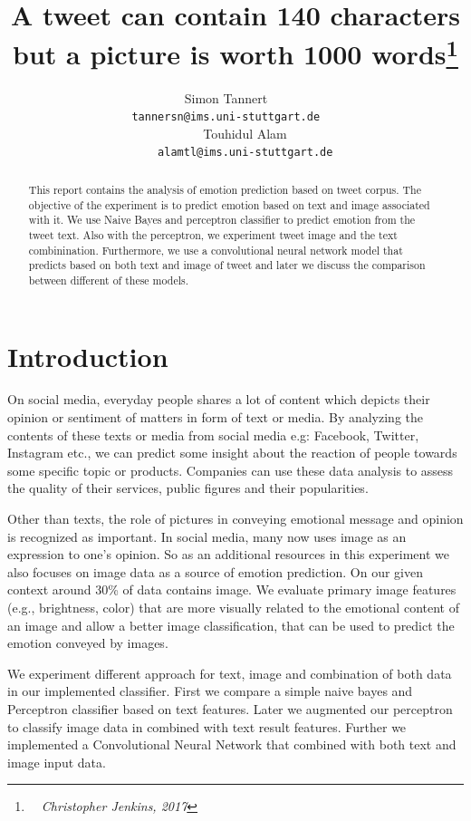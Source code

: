 \documentclass[11pt]{article}
\title{A tweet can contain 140 characters but a picture is worth 1000
  words\thanks{~~\emph{Christopher Jenkins, 2017}}}
\author{Simon Tannert~~~ \\
  {\tt tannersn@ims.uni-stuttgart.de~~~} \\\And
  ~~~Touhidul Alam \\
  {\tt ~~~alamtl@ims.uni-stuttgart.de} \\}
\date{}
\begin{document}
\maketitle
\begin{abstract}
  This report contains the analysis of emotion prediction based on tweet corpus. The objective of the experiment is to predict emotion based on text and image associated with it. We use Naive Bayes and perceptron classifier to predict emotion from the tweet text. Also with the perceptron, we experiment tweet image and the text combinination. Furthermore, we use a convolutional neural network model that predicts based on both text and image of tweet and later we discuss the comparison between different of these models.
\end{abstract}

\section{Introduction}

On social media, everyday people shares a lot of content which depicts their opinion or sentiment of matters in form of text or media. By analyzing the contents of these texts or media from social media e.g: Facebook, Twitter, Instagram etc., we can predict some insight about the reaction of people towards some specific topic or products. Companies can use these data analysis to assess the quality of their services, public figures and their popularities.

Other than texts, the role of pictures in conveying emotional message and opinion is recognized as important. In social media, many now uses image as an expression to one's opinion. So as an additional resources in this experiment we also focuses on image data as a source of emotion prediction. On our given context around 30\% of data contains image. We evaluate primary image features (e.g., brightness, color) that are more visually related to the emotional content of an image and allow a better image classification, that can be used to predict the emotion conveyed by images. 

We experiment different approach for text, image and combination of both data in our implemented classifier. First we compare a simple naive bayes and Perceptron classifier based on text features. Later we augmented our perceptron to classify image data in combined with text result features. Further we implemented a Convolutional Neural Network that combined with both text and image input data.
\end{document}
